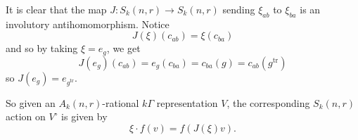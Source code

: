 \documentclass[12pt]{article}
\DeclareMathOperator{\1}{\mathbbm{1}}
\begin{document}
It is clear that the map $J:S_k(n,r)\to S_k(n,r)$ sending $\xi_{ab}$ to $\xi_{ba}$ is an involutory antihomomorphism.
Notice 
\[J(\xi)(c_{ab})=\xi(c_{ba})\]
and so by taking $\xi=e_g$, we get 
\[J(e_g)(c_{ab})=e_g(c_{ba})=c_{ba}(g)=c_{ab}(g^{\text{tr}})\]
so $J(e_g)=e_{g^{\text{tr}}}$.

So given an $A_k(n,r)$-rational $k\Gamma$ representation $V$, the corresponding $S_k(n,r)$ action on $V^\circ$ is given by 
\[\xi\cdot f (v)=f(J(\xi)v).\]


\medskip

\printbibliography
\end{document}

